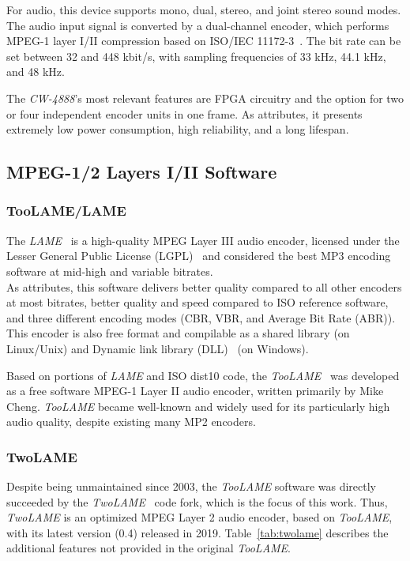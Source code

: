 For audio, this device supports mono, dual, stereo, and joint stereo sound modes. The audio input signal is converted by a dual-channel encoder, which performs MPEG-1 layer I/II compression based on ISO/IEC 11172-3~\cite{11172}. 
The bit rate can be set between 32 and 448 kbit/s, with sampling frequencies of 33 kHz, 44.1 kHz, and 48 kHz.

The \textit{CW-4888}'s most relevant features are FPGA circuitry and the option for two or four independent encoder units in one frame.
As attributes, it presents extremely low power consumption, high reliability, and a long lifespan.

\subsection{MPEG-1/2 Layers I/II Software}

\subsubsection{TooLAME/LAME}

The \textit{LAME}~\cite{lame} is a high-quality MPEG Layer III audio encoder, licensed under the Lesser General Public License (LGPL)~\cite{lgpl} and considered the best MP3 encoding software at mid-high and variable bitrates.\\
As attributes, this software delivers better quality compared to all other encoders at most bitrates, better quality and speed compared to ISO reference software, and three different encoding modes (CBR, VBR, and Average Bit Rate (ABR)). This encoder is also free format and compilable as a shared library (on Linux/Unix) and Dynamic link library (DLL)~\cite{dll} (on Windows).

Based on portions of \textit{LAME} and ISO dist10 code, the \textit{TooLAME}~\cite{toolame} was developed as a free software MPEG-1 Layer II audio encoder, written primarily by Mike Cheng. \textit{TooLAME} became well-known and widely used for its particularly high audio quality, despite existing many MP2 encoders.

\subsubsection{TwoLAME}

Despite being unmaintained since 2003, the \textit{TooLAME} software was directly succeeded by the \textit{TwoLAME}~\cite{twolame} code fork, which is the focus of this work.
Thus, \textit{TwoLAME} is an optimized MPEG Layer 2 audio encoder, based on \textit{TooLAME}, with its latest version (0.4) released in 2019. 
Table~\ref{tab:twolame} describes the additional features not provided in the original \textit{TooLAME}.

